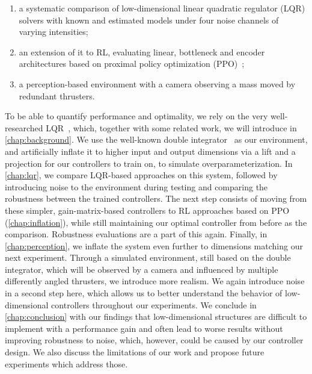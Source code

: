 \begin{enumerate}
	\item a systematic comparison of low-dimensional linear quadratic regulator (LQR) solvers with known and estimated models under four noise channels of varying intensities;
	\item an extension of it to RL, evaluating linear, bottleneck and encoder architectures based on proximal policy optimization (PPO)~\cite{Schulman2017Proximal};
	\item a perception-based environment with a camera observing a mass moved by redundant thrusters.
\end{enumerate}

To be able to quantify performance and optimality, we rely on the very well-researched LQR~\cite{Kalman1960Contributions,Hu2023Toward}, which,
together with some related work, we will introduce in \cref{chap:background}. We use the well-known double integrator~\cite{Rao2001Naive} as our environment,
and artificially inflate it to higher input and output dimensions via a lift and a projection for our controllers to train on, to simulate overparameterization.
In \cref{chap:lqr}, we compare LQR-based approaches on this system, followed by introducing noise to the environment during testing
and comparing the robustness between the trained controllers. The next step consists of moving from these simpler, gain-matrix-based controllers
to RL approaches based on PPO~\cite{Schulman2017Proximal} (\cref{chap:inflation}), while still
maintaining our optimal controller from before as the comparison. Robustness evaluations are a part of this again. Finally, in \cref{chap:perception},
we inflate the system even further to dimensions matching our next experiment. Through a simulated environment, still based on the double integrator,
which will be observed by a camera and influenced by multiple differently angled thrusters, we introduce more realism. We again introduce noise
in a second step here, which allows us to better understand the behavior of low-dimensional controllers throughout our experiments.
We conclude in \cref{chap:conclusion} with our findings that low-dimensional structures are difficult to implement
with a performance gain and often lead to worse results without improving robustness to noise, which,
however, could be caused by our controller design. We also discuss the
limitations of our work and propose future experiments which address those.